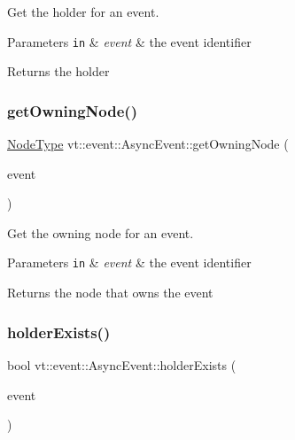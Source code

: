 Get the holder for an event. 


\begin{DoxyParams}[1]{Parameters}
\mbox{\tt in}  & {\em event} & the event identifier\\
\hline
\end{DoxyParams}
\begin{DoxyReturn}{Returns}
the holder 
\end{DoxyReturn}
\mbox{\label{structvt_1_1event_1_1_async_event_a288c3db66bf12de8dc65733b184870c0}} 
\subsubsection{\texorpdfstring{get\+Owning\+Node()}{getOwningNode()}}
{\footnotesize\ttfamily \hyperlink{namespacevt_a866da9d0efc19c0a1ce79e9e492f47e2}{Node\+Type} vt\+::event\+::\+Async\+Event\+::get\+Owning\+Node (\begin{DoxyParamCaption}\item[{\hyperlink{namespacevt_a009267401def7ae8bf201892222d060f}{Event\+Type} const \&}]{event }\end{DoxyParamCaption})}



Get the owning node for an event. 


\begin{DoxyParams}[1]{Parameters}
\mbox{\tt in}  & {\em event} & the event identifier\\
\hline
\end{DoxyParams}
\begin{DoxyReturn}{Returns}
the node that owns the event 
\end{DoxyReturn}
\mbox{\label{structvt_1_1event_1_1_async_event_a8aeeb83c7b467b3d130e522d079e5a7d}} 
\subsubsection{\texorpdfstring{holder\+Exists()}{holderExists()}}
{\footnotesize\ttfamily bool vt\+::event\+::\+Async\+Event\+::holder\+Exists (\begin{DoxyParamCaption}\item[{\hyperlink{namespacevt_a009267401def7ae8bf201892222d060f}{Event\+Type} const \&}]{event }\end{DoxyParamCaption})}



